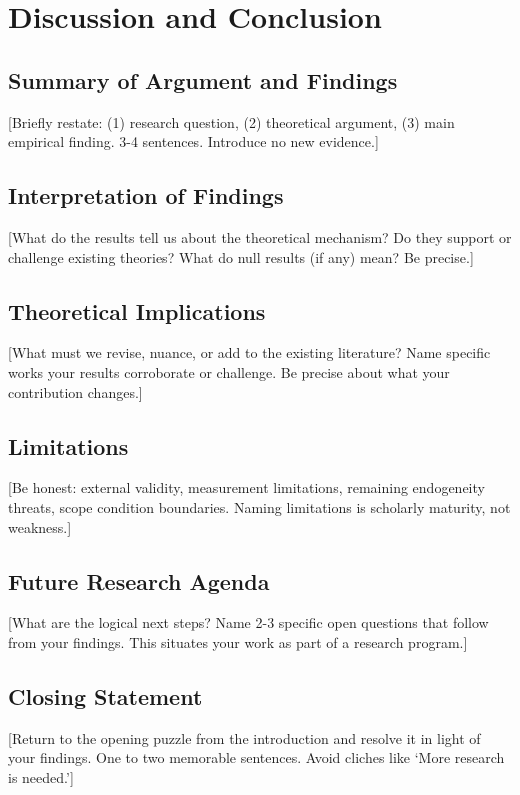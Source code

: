\documentclass[12pt,a4paper]{article}
\begin{document}
\section{Discussion and Conclusion}\label{sec:discussion} %

\subsection{Summary of Argument and Findings} %
[Briefly restate: (1) research question, (2) theoretical argument, (3) main empirical finding. 3-4 sentences. Introduce no new evidence.]

\subsection{Interpretation of Findings} %
[What do the results tell us about the theoretical mechanism? Do they support or challenge existing theories? What do null results (if any) mean? Be precise.]

\subsection{Theoretical Implications} %
[What must we revise, nuance, or add to the existing literature? Name specific works your results corroborate or challenge. Be precise about what your contribution changes.]

\subsection{Limitations} %
[Be honest: external validity, measurement limitations, remaining endogeneity threats, scope condition boundaries. Naming limitations is scholarly maturity, not weakness.]

\subsection{Future Research Agenda} %
[What are the logical next steps? Name 2-3 specific open questions that follow from your findings. This situates your work as part of a research program.]

\subsection{Closing Statement} %
[Return to the opening puzzle from the introduction and resolve it in light of your findings. One to two memorable sentences. Avoid cliches like `More research is needed.']
\end{document}
